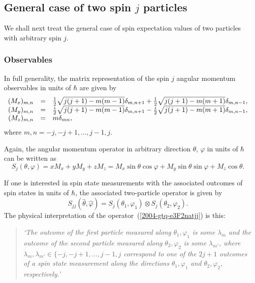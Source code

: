 \documentclass[pra,amsfonts,showpacs,showkeys,preprint]{revtex4}
\begin{document}

\subsection{General case of two spin $j$ particles}

We shall next treat the general case of spin expectation values of two particles with arbitrary spin $j$.

\subsubsection*{Observables}

In full generality, the matrix representation of the spin $j$ angular momentum observables in units of $\hbar$ are given by
\begin{equation}
\begin{array}{rcl}
(M_x)_{m,n}&=&
{1\over 2}\sqrt{j(j+1)-m(m-1)}\delta_{m,n+1} + {1\over 2}\sqrt{j(j+1)-m(m+1)}\delta_{m,n-1},\\
(M_y)_{m,n}&=&
{i\over 2}\sqrt{j(j+1)-m(m-1)}\delta_{m,n+1} -{i\over 2}\sqrt{j(j+1)-m(m+1)}\delta_{m,n-1},\\
(M_z)_{m,n}&=&m\delta_{mn},
\end{array}
\end{equation}
where $m,n=-j,-j+1,\ldots ,j-1,j$.

Again, the angular momentum operator in arbitrary direction $\theta$, $\varphi$ in units of $\hbar$ can be written as
\begin{equation}
S_j (\theta ,\varphi) =
xM_x
+
yM_y
+
zM_z
=
 M_x  \sin \theta \cos \varphi
+
M_y   \sin \theta \sin \varphi
+
M_z   \cos \theta
.
\label{e-2009-gtq-sjj}
\end{equation}


If one is interested in spin state measurements with the associated outcomes of spin states in units of $\hbar$,
the associated two-particle operator is given by
\begin{equation}
 S_{j j } ({\hat \theta},{\hat \varphi} ) =
S_{j }( \theta_1,\varphi_1 )
\otimes
S_{j }( \theta_2,\varphi_2 ).
\label{2004-gtq-e3F2natjj}
\end{equation}
The physical interpretation of the operator~(\ref{2004-gtq-e3F2natjj}) is this:
\begin{quote}
{\em `The outcome of the first particle measured along $\theta_1,\varphi_1$ is some $\lambda_{m}$
      and
      the outcome of the second particle measured along $\theta_2,\varphi_2$ is some $\lambda_{m'}$,
      where  $\lambda_{m}, \lambda_{m'}\in \{-j,-j+1,\ldots ,j-1,j$ correspond to one of the $2j+1$ outcomes of a spin state measurement
      along the directions $\theta_1,\varphi_1$ and $\theta_2,\varphi_2$, respectively.'
}
\end{quote}
\end{document}
